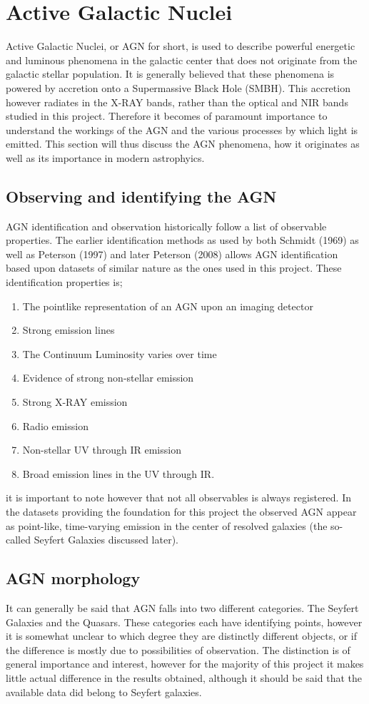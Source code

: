 \documentclass[a4paper, 12pt, twoside]{article}
\begin{document}
\section{Active Galactic Nuclei}
Active Galactic Nuclei, or AGN for short, is used to describe powerful energetic and luminous phenomena in the galactic center that does not originate from the galactic stellar population. It is generally believed that these phenomena is powered by accretion onto a Supermassive Black Hole (SMBH). This accretion however radiates in the X-RAY bands, rather than the optical and NIR bands studied in this project. Therefore it becomes of paramount importance to understand the workings of the AGN and the various processes by which light is emitted. This section will thus discuss the AGN phenomena, how it originates as well as its importance in modern astrophyics.

\subsection{Observing and identifying the AGN}
AGN identification and observation historically follow a list of observable properties. The earlier identification methods as used by both Schmidt (1969) as well as Peterson (1997) and later Peterson (2008) allows AGN identification based upon datasets of similar nature as the ones used in this project. These identification properties is; 
\begin{enumerate}
\item The pointlike representation of an AGN upon an imaging detector
\item Strong emission lines
\item The Continuum Luminosity varies over time
\item Evidence of strong non-stellar emission
\item Strong X-RAY emission
\item Radio emission
\item Non-stellar UV through IR emission
\item Broad emission lines in the UV through IR.
\end{enumerate}
it is important to note however that not all observables is always registered. In the datasets providing the foundation for this project the observed AGN appear as point-like, time-varying emission in the center of resolved galaxies (the so-called Seyfert Galaxies discussed later).
\\
\subsection{AGN morphology}
It can generally be said that AGN falls into two different categories. The Seyfert Galaxies and the Quasars. These categories each have identifying points, however it is somewhat unclear to which degree they are distinctly different objects, or if the difference is mostly due to possibilities of observation. The distinction is of general importance and interest, however for the majority of this project it makes little actual difference in the results obtained, although it should be said that the available data did belong to Seyfert galaxies. 
\end{document}
